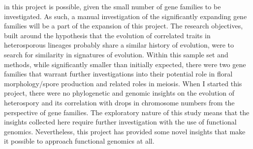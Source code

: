 in this project is possible, given the small number of gene families to be investigated. As such, a
manual investigation of the significantly expanding gene families will be a part of the expansion
of this project.
The research objectives, built around the hypothesis that the evolution of correlated traits
in heterosporous lineages probably share a similar history of evolution, were to search for
similarity in signatures of evolution. Within this sample set and methods, while significantly
smaller than initially expected, there were two gene families that warrant further investigations
into their potential role in floral morphology/spore production and related roles in meiosis. When
I started this project, there were no phylogenetic and genomic insights on the evolution of
heterospory and its correlation with drops in chromosome numbers from the perspective of gene
families. The exploratory nature of this study means that the insights collected here require
further investigation with the use of functional genomics. Nevertheless, this project has provided
some novel insights that make it possible to approach functional genomics at all.
